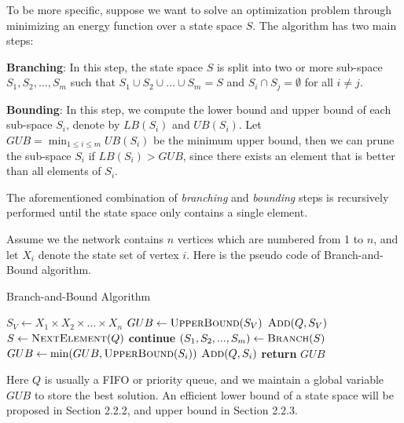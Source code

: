 To be more specific, suppose we want to solve an optimization problem through minimizing an energy function over a state space $S$. The algorithm has two main steps:

\noindent \textbf{Branching}: In this step, the state space $S$ is split into two or more sub-space $S_1,S_2,\dots,S_m$ such that $S_1\cup S_2\cup\dots\cup S_m=S$ and $S_i\cap S_j=\emptyset$ for all $i\neq j$.

\noindent \textbf{Bounding}: In this step, we compute the lower bound and upper bound of each sub-space $S_i$, denote by $LB(S_i)$ and $UB(S_i)$. Let $GUB=\min_{1\le i\le m}UB(S_i)$ be the minimum upper bound, then we can prune the sub-space $S_i$ if $LB(S_i)>GUB$, since there exists an element that is better than all elements of $S_i$.

The aforementioned combination of \textit{branching} and \textit{bounding} steps is recursively performed until the state space only contains a single element.

Assume we the network contains $n$ vertices which are numbered from 1 to $n$, and let $X_i$ denote the state set of vertex $i$. Here is the pseudo code of Branch-and-Bound algorithm.

\begin{algorithm}[!h]
\caption{Branch-and-Bound Algorithm}
\begin{algorithmic}[1]
    \State $S_V \gets X_1\times X_2\times\dots\times X_n$
    \State $GUB \gets \textsc{UpperBound}(S_V)$
    \State $\textsc{Add}(Q, S_V)$
        \State $S \gets \textsc{NextElement}(Q)$
            \State \textbf{continue}
        \EndIf
        \State $(S_1,S_2,...,S_m) \gets \textsc{Branch}(S)$
            \State $GUB \gets \min(GUB, \textsc{UpperBound}(S_i))$
        \EndFor
                \State $\textsc{Add}(Q, S_i)$
            \EndIf
        \EndFor
    \EndWhile
    \State \textbf{return }$GUB$
\EndFunction
\end{algorithmic}
\end{algorithm}

Here $Q$ is usually a FIFO or priority queue, and we maintain a global variable $GUB$ to store the best solution. An efficient lower bound of a state space will be proposed in Section 2.2.2, and upper bound in Section 2.2.3.

